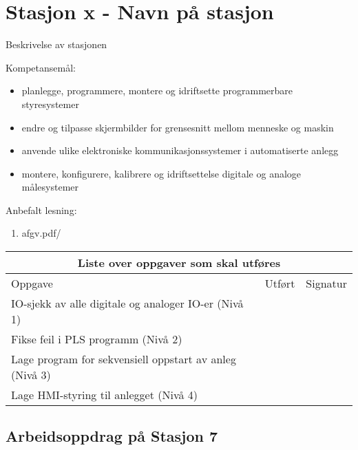
\noindent
\section*{Stasjon x - Navn på stasjon}

\vskip 5pt
Beskrivelse av stasjonen

Kompetansemål:
\begin{itemize}[noitemsep]
	\item planlegge, programmere, montere og idriftsette programmerbare styresystemer
	\item endre og tilpasse skjermbilder for grensesnitt mellom menneske og maskin
	\item anvende ulike elektroniske kommunikasjonssystemer i automatiserte anlegg
	\item montere, konfigurere, kalibrere og idriftsettelse digitale og analoge målesystemer
\end{itemize}

Anbefalt lesning:

\begin{enumerate}
	\item afgv.pdf/ 
\end{enumerate}


\begin{center}
\begin{tabular}{ | m{10cm} | m{1cm}| m{2cm} | } 
\hline
\multicolumn{3}{|c|}{Liste over oppgaver som skal utføres} \\
	\hline
	Oppgave	& Utført & Signatur \\ 
	\hline
	\hline
	\cellcolor{green!60}IO-sjekk av alle digitale og analoger IO-er (Nivå 1)	& & \\ 
	\hline
	\cellcolor{yellow!60}Fikse feil i PLS programm (Nivå 2)	& & \\ 
	\hline
	\cellcolor{orange!60}Lage program for sekvensiell oppstart av anleg (Nivå 3)	& & \\ 
	\hline
	\cellcolor{red!60}Lage HMI-styring til anlegget (Nivå 4)	& & \\ 
	\hline
\end{tabular}
\end{center}

\subsection*{Arbeidsoppdrag på Stasjon 7}

